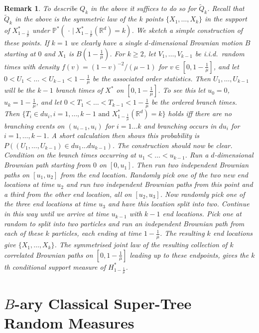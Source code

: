\documentclass[12pt]{article}
\numberwithin{theorem}{section}
\newtheorem{remark}[theorem]{Remark}
\theoremstyle{def}
\numberwithin{equation}{section}
\renewcommand{\P}{\mathbb{P}}
\newcommand{\R}{\mathbb{R}}
\begin{document}
\begin{remark}\label{Qkprops} To describe $Q_k$ in the above it suffices to do so for $\tilde Q_k$.  
Recall that $\tilde Q_k$ in the above is the symmetric law of the $k$ points $\{X_1,\dots,X_k\}$ in the support of $X^*_{1-\frac{1}{\mu}}$ under $\P^*(\, \cdot\,| \, X^*_{1-\frac{1}{\mu}}(\R^d)=k)$. 
We sketch a simple construction of these points.  
If $k=1$ we clearly have a single $d$-dimensional Brownian motion $B$ starting at $0$ and $X_1$ is $B(1-\frac{1}{\mu})$.  
For $k\ge 2$, let $V_1,\dots,V_{k-1}$ be i.i.d.\ random times with density $f(v)=(1-v)^{-2}/(\mu-1)$ for $v\in[0,1-\frac{1}{\mu}]$, and let $0<U_1<\dots<U_{k-1}<1-\frac{1}{\mu}$ be the associated order statistics.  
Then $U_1,\dots,U_{k-1}$ will be the $k-1$ branch times of $X^*$ on $[0,1-\frac{1}{\mu}]$. 
To see this let $u_0=0$, $u_k=1-\frac{1}{\mu}$, and let $0<T_1<\dots<T_{k-1}<1-\frac{1}{\mu}$ be the ordered branch times. 
Then $\{T_i\in du_i, i=1,\dots,k-1\text{ and }X^*_{1-\frac{1}{\mu}}(\R^d)=k\}$ holds iff there are no branching events on $(u_{i-1},u_i)$ for $i=1\dots k$ and branching occurs in $du_i$ for $i=1,\dots,k-1$.  
A short calculation then shows this probability is $P((U_1,\dots,U_{k-1})\in du_1... du_{k-1})$.  The construction should now be clear.  
Condition on the branch times occurring at $u_1<\dots<u_{k-1}$. 
Run a $d$-dimensional Brownian path starting from $0$ on $[0,u_1]$. 
Then run two independent Brownian paths on $[u_1,u_2]$ from the end location.  
Randomly pick one of the two new end locations at time $u_2$ and run two independent Brownian paths from this point and a third from the other end location, all on $[u_2,u_3]$.  
Now randomly pick one of the three end locations at time $u_3$ and have this location split into two. 
Continue in this way until we arrive at time $u_{k-1}$ with $k-1$ end locations.  
Pick one at random to split into two particles and run an independent Brownian path from each of these $k$ particles, each ending at time $1-\frac{1}{\mu}$. 
The resulting $k$ end locations give $\{X_1,\dots, X_k\}$.  
The symmetrised joint law of the resulting collection of $k$ correlated Brownian paths on $[0,1-\frac{1}{\mu}]$ leading up to these endpoints, gives the $k$th conditional support measure of $H^*_{1-\frac{1}{\mu}}$. 
\end{remark}

\section{$B$-ary Classical Super-Tree Random Measures}\label{sec:Bary}
\end{document}
